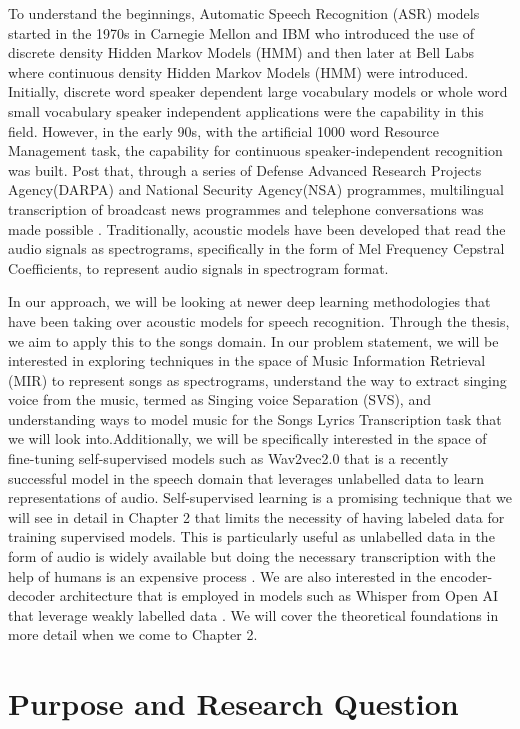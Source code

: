 To understand the beginnings, Automatic Speech Recognition (ASR) models started in the 1970s in Carnegie Mellon and IBM who introduced the use of discrete density Hidden Markov Models (HMM) and then later at Bell Labs where continuous density Hidden Markov Models (HMM) were introduced. Initially, discrete word speaker dependent large vocabulary models or whole word small vocabulary speaker independent applications were the capability in this field. However, in the early 90s, with the artificial 1000 word Resource Management task, the capability for continuous speaker-independent recognition was built. Post that, through a series of Defense Advanced Research Projects Agency(DARPA) and National Security Agency(NSA) programmes, multilingual transcription of broadcast news programmes and telephone conversations was made possible \cite{gales2008application}. Traditionally, acoustic models have been developed that read the audio signals as spectrograms, specifically in the form of Mel Frequency Cepstral Coefficients, to represent audio signals in spectrogram format.

In our approach, we will be looking at newer deep learning methodologies that have been taking over acoustic models for speech recognition. Through the thesis, we aim to apply this to the songs domain. In our problem statement, we will be interested in exploring techniques in the space of Music Information Retrieval (MIR) to represent songs as spectrograms, understand the way to extract singing voice from the music, termed as Singing voice Separation (SVS), and understanding ways to model music for the Songs Lyrics Transcription task that we will look into.Additionally, we will be specifically interested in the space of fine-tuning self-supervised models such as Wav2vec2.0 that is a recently successful model in the speech domain that leverages unlabelled data to learn representations of audio. Self-supervised learning is a promising technique that we will see in detail in Chapter 2 that limits the necessity of having labeled data for training supervised models. This is particularly useful as unlabelled data in the form of audio is widely available but doing the necessary transcription with the help of humans is an expensive process \cite{baevski2020wav2vec}. We are also interested in the encoder-decoder architecture that is employed in models such as Whisper from Open AI that leverage weakly labelled data \cite{radford2023robust}. We will cover the theoretical foundations in more detail when we come to Chapter 2.

\section{Purpose and Research Question}%
\label{sec:purpose}

